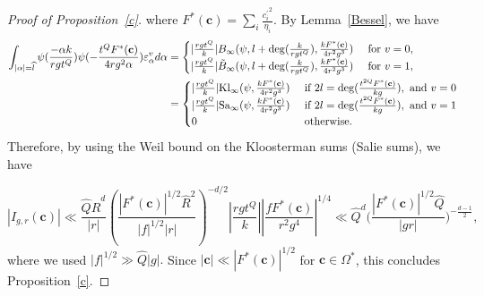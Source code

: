 \documentclass[11pt]{amsart}
\theoremstyle{plain}
\theoremstyle{plain}
\renewcommand{\vec}[1]{\mathbf{#1}}
\theoremstyle{remark}
\theoremstyle{definition}
\renewcommand{\hat}{\widehat}
\newcommand{\hQ}{\widehat{Q}}
\newcommand{\hR}{\widehat{R}}
\newcommand{\Kl}{\textup{Kl}}
\newcommand{\Sa}{\textup{Sa}}
\begin{document}
\begin{proof}[Proof of Proposition~\ref{c}]
where $F^*(\vec{c})=\sum_{i} \frac{{c_i^{\prime}}^2}{\eta_i}.$  By Lemma~\ref{Bessel}, we have 
\begin{equation*}
\begin{split}
\int _{ |\alpha| =\hat{l}  }  \psi(\frac{-\alpha k}{rgt^Q})   \psi (-\frac{t^QF^*(\vec{c})}{4rg^2 \alpha}) \varepsilon_{\alpha}^v  d\alpha&=\begin{cases} |\frac{rgt^Q}{ k}|B_{\infty}(\psi,l+\deg(\frac{ k}{rgt^Q}),\frac{kF^*(\vec{c})}{4r^2g^3}) &\text{ for } v=0,
\\
 |\frac{rgt^Q}{ k}|\tilde{B}_{\infty}(\psi,l+\deg(\frac{ k}{rgt^Q}),\frac{kF^*(\vec{c})}{4r^2g^3}) &\text{ for } v=1,
\end{cases}
\\
&=\begin{cases} 
 |\frac{rgt^Q}{ k}|\Kl_{\infty}(\psi, \frac{kF^*(\vec{c})}{4r^2g^3}) &\text{  if } 2l=\deg(\frac{t^{2Q}F^*(\vec{c})}{kg}), \text{ and } v=0
 \\
 |\frac{rgt^Q}{ k}|\Sa_{\infty}(\psi, \frac{kF^*(\vec{c})}{4r^2g^3}) &\text{  if } 2l=\deg(\frac{t^{2Q}F^*(\vec{c})}{kg}), \text{ and } v=1
 \\
 0 &\text{ otherwise.}
 \end{cases} 
\end{split}
\end{equation*}
Therefore, by using the Weil bound on the Kloosterman sums (Salie sums),  we have

\[
|I_{g,r}(\vec{c})| \ll \frac{\hQ\hR^{d}}{|r|}\left(\frac{ |F^*(\vec{c})|^{1/2} \hR^2}{|f|^{1/2}|r|}\right)^{-d/2} \left|\frac{rgt^Q}{ k}\right|   \left|\frac{fF^*(\vec{c})}{r^2g^4}\right|^{1/4}\ll  \hQ^d\Big(\frac{|F^*(\vec{c})|^{1/2}\hQ}{|gr|}   \Big)^{-\frac{d-1}{2}},
\]
where we used $|f|^{1/2}\gg \hQ|g|.$ Since $|\vec{c}|\ll |F^*(\vec{c})|^{1/2} $ for $\vec{c}\in \Omega^*$, this concludes Proposition~\ref{c}.

\end{proof}
\end{document}
